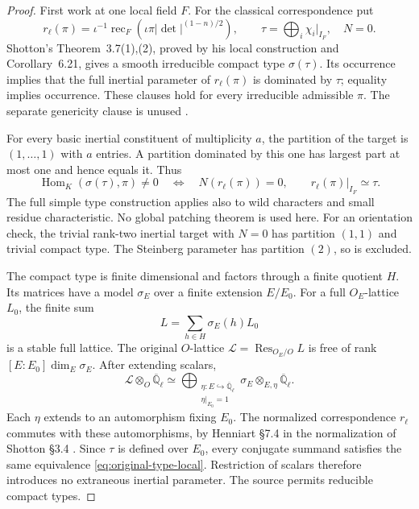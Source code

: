 \begin{proof}
First work at one local field \(F\). For the classical correspondence put
\[
 r_\ell(\pi)=\iota^{-1}
       \operatorname{rec}_F\!\left(\iota\pi|\det|^{(1-n)/2}\right),
 \qquad \tau=\bigoplus_i\chi_i|_{I_F},\quad N=0.
\]
Shotton's Theorem~3.7(1),(2), proved by his local construction and
Corollary~6.21, gives a smooth irreducible compact type \(\sigma(\tau)\).
Its occurrence implies that the full inertial parameter of
\(r_\ell(\pi)\) is dominated by \(\tau\); equality implies occurrence.
These clauses hold for every irreducible admissible \(\pi\).
The separate genericity clause is unused
\cite{SelmerTypeShotton}.

For every basic inertial constituent of multiplicity \(a\), the partition
of the target is \((1,\ldots,1)\) with \(a\) entries.
A partition dominated by this one has largest part at most one and hence
equals it. Thus
\begin{equation}
\label{eq:original-type-local}
 \operatorname{Hom}_K(\sigma(\tau),\pi)\ne0
 \quad\Longleftrightarrow\quad
 N(r_\ell(\pi))=0,\qquad r_\ell(\pi)|_{I_F}\simeq\tau.
\end{equation}
The full simple type construction applies also to wild characters and
small residue characteristic. No global patching theorem is used here.
For an orientation check, the trivial rank-two inertial target with
\(N=0\) has partition \((1,1)\) and trivial compact type. The Steinberg
parameter has partition \((2)\), so is excluded.

The compact type is finite dimensional and factors through a finite
quotient \(H\). Its matrices have a model \(\sigma_E\) over a finite
extension \(E/E_0\). For a full \(O_E\)-lattice \(L_0\), the finite sum
\[
                  L=\sum_{h\in H}\sigma_E(h)L_0
\]
is a stable full lattice. The original \(O\)-lattice
\(\mathcal L=\operatorname{Res}_{O_E/O}L\) is free of rank
\([E:E_0]\dim_E\sigma_E\).
After extending scalars,
\[
 \mathcal L\otimes_O\overline{\mathbb Q}_\ell
 \simeq\bigoplus_{\substack{\eta:E\hookrightarrow\overline{\mathbb Q}_\ell\\
                         \eta|_{E_0}=1}}\sigma_E\otimes_{E,\eta}
                                  \overline{\mathbb Q}_\ell .
\]
Each \(\eta\) extends to an automorphism fixing \(E_0\).
The normalized correspondence \(r_\ell\) commutes with these
automorphisms, by Henniart \S7.4 in the normalization of Shotton \S3.4
\cite{SelmerTypeHenniart,SelmerTypeShotton}.
Since \(\tau\) is defined over \(E_0\), every conjugate summand satisfies
the same equivalence \eqref{eq:original-type-local}.
Restriction of scalars therefore introduces no extraneous inertial
parameter. The source permits reducible compact types.


\end{proof}
